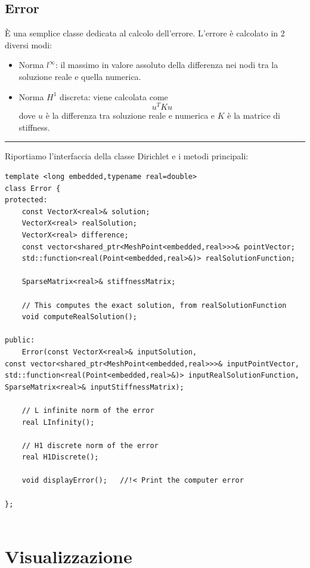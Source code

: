 \documentclass[oneside,12pt]{book}  %
\theoremstyle{plain}
\theoremstyle{definition}
\theoremstyle{remark}
\numberwithin{equation}{chapter} %
\begin{document}
\subsection{Error}
\`E una semplice classe dedicata al calcolo dell'errore. L'errore \`e
calcolato in 2 diversi modi:
\begin{itemize}
\item Norma $l^\infty$: il massimo in valore assoluto della differenza
  nei nodi tra la soluzione reale e quella numerica.

\item Norma $H^1$ discreta: viene calcolata come $$u^TKu$$ dove $u$
  \`e la differenza tra soluzione reale e numerica e $K$ \`e la matrice di stiffness.

\end{itemize}

\noindent\rule{14cm}{1pt}

Riportiamo l'interfaccia della classe Dirichlet e i metodi principali:

\begin{verbatim}
template <long embedded,typename real=double>
class Error {
protected:
    const VectorX<real>& solution;
    VectorX<real> realSolution;
    VectorX<real> difference;
    const vector<shared_ptr<MeshPoint<embedded,real>>>& pointVector;
    std::function<real(Point<embedded,real>&)> realSolutionFunction;
	
    SparseMatrix<real>& stiffnessMatrix;
	
    // This computes the exact solution, from realSolutionFunction
    void computeRealSolution(); 
	
public:
    Error(const VectorX<real>& inputSolution,
const vector<shared_ptr<MeshPoint<embedded,real>>>& inputPointVector,
std::function<real(Point<embedded,real>&)> inputRealSolutionFunction,
SparseMatrix<real>& inputStiffnessMatrix);

    // L infinite norm of the error
    real LInfinity();
	
    // H1 discrete norm of the error
    real H1Discrete();
	
    void displayError();   //!< Print the computer error
	
};


\end{verbatim}

\section{Visualizzazione}
\label{sec:visualizzazione}
\end{document}
